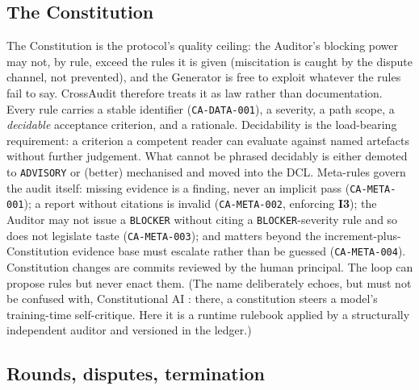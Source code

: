 \documentclass[11pt,letterpaper]{article}
\newcommand{\invariant}[1]{\textbf{I#1}}
\newcommand{\rulename}[1]{\texttt{#1}}
\begin{document}
\subsection{The Constitution}\label{sec:constitution}

The Constitution is the protocol's quality ceiling: the Auditor's blocking power may not, by rule, exceed the rules it is given (miscitation is caught by the dispute channel, not prevented), and the Generator is free to exploit whatever the rules fail to say. CrossAudit therefore treats it as law rather than documentation. Every rule carries a stable identifier (\rulename{CA-DATA-001}), a severity, a path scope, a \emph{decidable} acceptance criterion, and a rationale. Decidability is the load-bearing requirement: a criterion a competent reader can evaluate against named artefacts without further judgement. What cannot be phrased decidably is either demoted to \texttt{ADVISORY} or (better) mechanised and moved into the DCL. Meta-rules govern the audit itself: missing evidence is a finding, never an implicit pass (\rulename{CA-META-001}); a report without citations is invalid (\rulename{CA-META-002}, enforcing \invariant{3}); the Auditor may not issue a \texttt{BLOCKER} without citing a \texttt{BLOCKER}-severity rule and so does not legislate taste (\rulename{CA-META-003}); and matters beyond the increment-plus-Constitution evidence base must escalate rather than be guessed (\rulename{CA-META-004}). Constitution changes are commits reviewed by the human principal. The loop can propose rules but never enact them. (The name deliberately echoes, but must not be confused with, Constitutional AI \cite{bai2022constitutional}: there, a constitution steers a model's training-time self-critique. Here it is a runtime rulebook applied by a structurally independent auditor and versioned in the ledger.)

\subsection{Rounds, disputes, termination}\label{sec:rounds}
\end{document}
